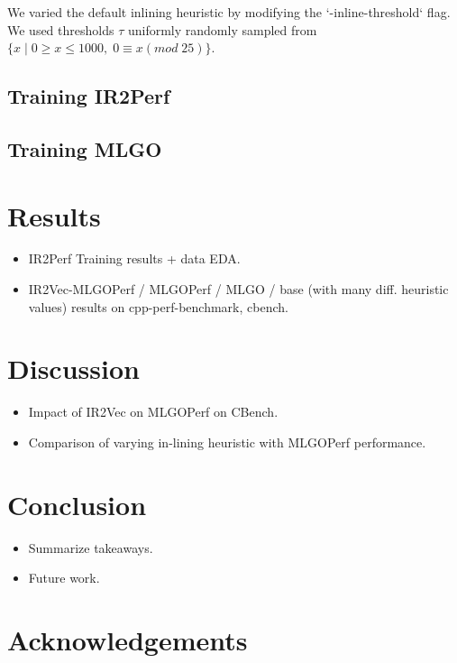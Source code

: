 \documentclass[nohyperref]{article}
\theoremstyle{plain}
\theoremstyle{definition}
\theoremstyle{remark}
\begin{document}
We varied the default inlining heuristic by modifying the `-inline-threshold` flag. We used thresholds $\tau$ uniformly randomly sampled from $\bigr\{x\;|\;0 \geq x \leq 1000,\;0 \equiv x (mod\;25)\bigr\}$.

\subsection{Training IR2Perf}

\subsection{Training MLGO}

\section{Results}
\label{results}
\begin{itemize}
\item IR2Perf Training results + data EDA\@.
\item IR2Vec-MLGOPerf / MLGOPerf / MLGO / base (with many diff. heuristic values) results on cpp-perf-benchmark, cbench\@.
\end{itemize}

\section{Discussion}
\label{discussion}
\begin{itemize}
\item Impact of IR2Vec on MLGOPerf on CBench\@.
\item Comparison of varying in-lining heuristic with MLGOPerf performance\@.
\end{itemize}

\section{Conclusion}
\label{conclusion}
\begin{itemize}
\item Summarize takeaways\@.
\item Future work\@.
\end{itemize}

\section*{Acknowledgements}
\end{document}
